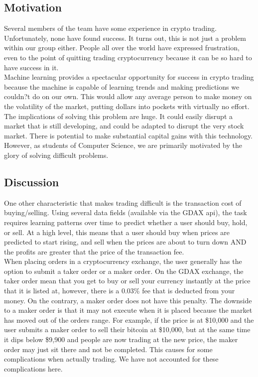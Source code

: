 \documentclass{article}
\begin{document}
\subsection{ Motivation }
Several members of the team have some experience in crypto trading. Unfortunately, none have found success. It turns out, this is not just a problem within our group either. People all over the world have expressed frustration, even to the point of quitting trading cryptocurrency because it can be so hard to have success in it. \\

 Machine learning provides a spectacular opportunity for success in crypto trading because the machine is capable of learning trends and making predictions we couldn?t do on our own. This would allow any average person to make money on the volatility of the market, putting dollars into pockets with virtually no effort. \\
					
The implications of solving this problem are huge. It could easily disrupt a market that is still developing, and could be adapted to disrupt the very stock market. There is potential to make substantial capital gains with this technology. However, as students of Computer Science, we are primarily motivated by the glory of solving difficult problems. \\

\subsection{ Discussion }
One other characteristic that makes trading difficult is the transaction cost of buying/selling. Using several data fields (available via the GDAX api), the task requires learning patterns over time to predict whether a user should buy, hold, or sell. At a high level, this means that a user should buy when prices are predicted to start rising, and sell when the prices are about to turn down AND the profits are greater that the price of the transaction fee. \\

When placing orders in a cryptocurrency exchange, the user generally has the option to submit a taker order or a maker order. On the GDAX exchange, the taker order mean that you get to buy or sell your currency instantly at the price that it is listed at, however, there is a 0.03\% fee that is deducted from your money. On the contrary, a maker order does not have this penalty. The downside to a maker order is that it may not execute when it is placed because the market has moved out of the orders range. For example, if the price is at \$10,000 and the user submits a maker order to sell their bitcoin at \$10,000, but at the same time it dips below \$9,900 and people are now trading at the new price, the maker order may just sit there and not be completed. This causes for some complications when actually trading. We have not accounted for these complications here. \\
								
\end{document}
